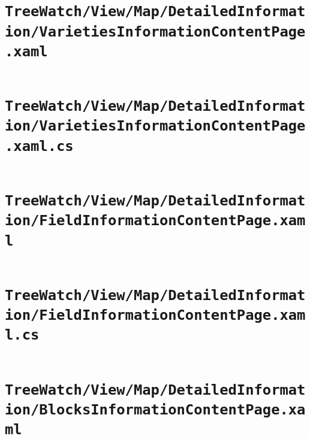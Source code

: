 \documentclass[12pt]{article}
\begin{document}
\section[\texttt{TreeWatch/View/Map/…/VarietiesInformationContentPage.xaml}]
{\texttt{TreeWatch/View/Map/DetailedInformation/\linebreak VarietiesInformationContentPage.xaml}}
	\inputminted[linenos]{xml}{../../../src/TreeWatch/View/Map/DetailedInformation/VarietiesInformationContentPage.xaml}
	\pagebreak

\section[\texttt{TreeWatch/View/Map/…/VarietiesInformationContentPage.xaml.cs}]
{\texttt{TreeWatch/View/Map/DetailedInformation/\linebreak VarietiesInformationContentPage.xaml.cs}}
	\inputminted[linenos,firstline=22]{csharp}{../../../src/TreeWatch/View/Map/DetailedInformation/VarietiesInformationContentPage.xaml.cs}
	\pagebreak

\section[\texttt{TreeWatch/View/Map/…/FieldInformationContentPage.xaml}]
{\texttt{TreeWatch/View/Map/DetailedInformation/\linebreak FieldInformationContentPage.xaml}}
	\inputminted[linenos]{xml}{../../../src/TreeWatch/View/Map/DetailedInformation/FieldInformationContentPage.xaml}
	\pagebreak

\section[\texttt{TreeWatch/View/Map/…/FieldInformationContentPage.xaml.cs}]
{\texttt{TreeWatch/View/Map/DetailedInformation/\linebreak FieldInformationContentPage.xaml.cs}}
	\inputminted[linenos,firstline=22]{csharp}{../../../src/TreeWatch/View/Map/DetailedInformation/FieldInformationContentPage.xaml.cs}
	\pagebreak

\section[\texttt{TreeWatch/View/Map/…/BlocksInformationContentPage.xaml}]
{\texttt{TreeWatch/View/Map/DetailedInformation/\linebreak BlocksInformationContentPage.xaml}}
	\inputminted[linenos]{xml}{../../../src/TreeWatch/View/Map/DetailedInformation/BlocksInformationContentPage.xaml}
	\pagebreak
\end{document}
